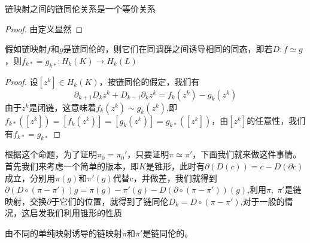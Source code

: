 \begin{proposition}
链映射之间的链同伦关系是一个等价关系
\end{proposition}
\begin{proof}
由定义显然
\end{proof}
\begin{proposition}\label{pro1588}
假如链映射$f$和$g$是链同伦的，则它们在同调群之间诱导相同的同态，即若$D:f\simeq g$，则$f_{k*}=g_{k*}:H_{k}(K)\rightarrow H_{k}(L)$
\end{proposition}
\begin{proof}
设$[z^{k}]\in H_{k}(K)$，按链同伦的假定，我们有
\begin{equation*}
    \partial_{k+1}D_{k}z^{k}+D_{k-1}\partial_{k}z^{k}=f_{k}(z^{k})-g_{k}(z^{k})
\end{equation*}
由于$z^{k}$是闭链，这意味着$f_{k}(z^{k})\sim g_{k}(z^{k})$,即$f_{k*}([z^{k}])=[f_{k}(z^{k})]=[g_{k}(z^{k})]=g_{k*}([z^{k}])$，由$[z^{k}]$的任意性，我们有$f_{k*}=g_{k*}$
\end{proof}
根据这个命题，为了证明$\pi_{0}=\pi_{0}'$，只要证明$\pi\simeq \pi'$，下面我们就来做这件事情。\\
首先我们来考虑一个简单的版本，即$K$是锥形，此时有$\partial(D(c))=c-D(\partial c)$成立，分别用$\pi(g)$和$\pi'(g)$代替c，并做差，我们就得到$\partial(D\circ (\pi-\pi'))g=\pi(g)-\pi'(g)-D(\partial\circ(\pi-\pi'))(g)$,利用$\pi,\;\pi'$是链映射，交换$\partial$于它们的位置，就得到了链同伦$D_{k}=D\circ (\pi-\pi')$,对于一般的情况，这启发我们利用锥形的性质
\begin{proposition}\label{pro1600}
由不同的单纯映射诱导的链映射$\pi$和$\pi'$是链同伦的。
\end{proposition}
